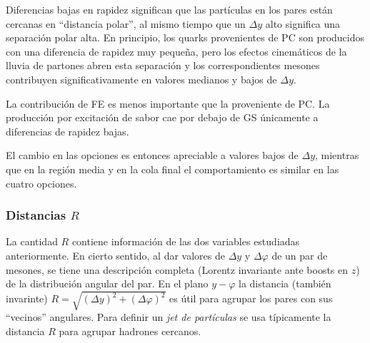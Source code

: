 \documentclass[a4paper,12pt]{article}
\begin{document}
Diferencias bajas en rapidez significan que las partículas en los pares están cercanas en ``distancia polar'', al mismo tiempo que un $\Delta y$ alto significa una separación polar alta. En principio, los quarks provenientes de PC son producidos con una diferencia de rapidez muy pequeña, pero los efectos cinemáticos de la lluvia de partones abren esta separación y los correspondientes mesones contribuyen significativamente en valores medianos y bajos de $\Delta y$.

La contribución de FE es menos importante que la proveniente de PC. La producción por excitación de sabor cae por debajo de GS únicamente a diferencias de rapidez bajas.

El cambio en las opciones es entonces apreciable a valores bajos de $\Delta y$, mientras que en la región media y en la cola final el comportamiento es similar en las cuatro opciones.

\subsubsection{Distancias $R$}

La cantidad $R$ contiene información de las dos variables estudiadas anteriormente. En cierto sentido, al dar valores de $\Delta y$ y $\Delta \varphi$ de un par de mesones, se tiene una descripción completa (Lorentz invariante ante boosts en $z$) de la distribución angular del par. En el plano $y - \varphi$ la distancia (también invarinte) $R=\sqrt{(\Delta y)^2 + (\Delta \varphi)^2}$ es útil para agrupar los pares con sus ``vecinos'' angulares. Para definir un \textit{jet de partículas} se usa típicamente la distancia $R$ para agrupar hadrones cercanos.
\end{document}

